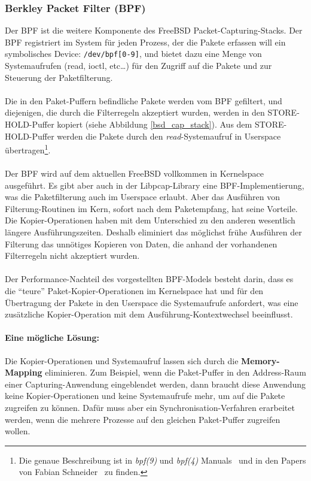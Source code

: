 \subsubsection{Berkley Packet Filter (BPF)}\label{sec:bpf}
Der BPF ist die weitere Komponente des FreeBSD Packet-Capturing-Stacks. Der BPF
registriert im System für jeden Prozess, der die Pakete erfassen will ein
symbolisches Device: \verb+/dev/bpf[0-9]+, und bietet dazu eine Menge von
Systemaufrufen (read, ioctl, etc\ldots) für den Zugriff auf die Pakete und zur
Steuerung der Paketfilterung.\\\\
%
Die in den Paket-Puffern befindliche Pakete werden vom BPF gefiltert, und
diejenigen, die durch die Filterregeln akzeptiert wurden, werden in den
STORE-HOLD-Puffer kopiert (siehe Abbildung \ref{bsd_cap_stack}).  Aus dem
STORE-HOLD-Puffer werden die Pakete durch den \emph{read}-Systemaufruf in
Userspace übertragen\footnote{Die genaue Beschreibung ist in \emph{bpf(9)} und
\emph{bpf(4)} Manuals~\cite{man_kernel_bpf, man_bpf} und in den Papers von Fabian
Schneider~\cite{fabian_da, pcin10gb_paper} zu finden.}.\\\\
%
Der BPF wird auf dem aktuellen FreeBSD vollkommen in Kernelspace ausgeführt.
Es gibt aber auch in der Libpcap-Library eine BPF-Implementierung, was  die
Paketfilterung auch im Userspace erlaubt. Aber das Ausführen von
Filterung-Routinen im Kern, sofort nach dem Paketempfang, hat seine Vorteile.
Die Kopier-Operationen haben mit dem Unterschied zu den anderen wesentlich
längere Ausführungszeiten. Deshalb eliminiert das möglichst frühe Ausführen der
Filterung  das unnötiges Kopieren von Daten, die anhand der vorhandenen
Filterregeln nicht akzeptiert wurden.\\\\
%
Der Performance-Nachteil des vorgestellten BPF-Models besteht darin, dass es
die ``teure'' Paket-Kopier-Operationen im Kernelspace hat und für den
Übertragung der Pakete in den Userspace die Systemaufrufe anfordert, was eine
zusätzliche Kopier-Operation mit dem Ausführung-Kontextwechsel beeinflusst.
%
\paragraph*{Eine mögliche Lösung:}
Die Kopier-Operationen und Systemaufruf lassen sich durch die
\textbf{Memory-Mapping} eliminieren. Zum Beispiel, wenn die Paket-Puffer in den
Address-Raum einer Capturing-Anwendung eingeblendet werden, dann braucht diese
Anwendung keine Kopier-Operationen und keine Systemaufrufe mehr, um auf die
Pakete zugreifen zu können. Dafür muss aber ein Synchronisation-Verfahren
erarbeitet werden, wenn die mehrere Prozesse auf den gleichen Paket-Puffer
zugreifen wollen.

